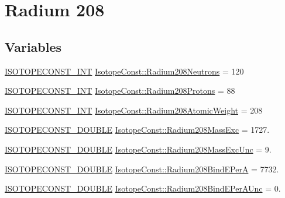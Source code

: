 \hypertarget{group___isotope_const-_radium-_ra208}{}\section{Radium 208}
\label{group___isotope_const-_radium-_ra208}
\subsection*{Variables}
\begin{DoxyCompactItemize}
\item 
\mbox{\hyperlink{group___isotope_const-_macros_ga5f18360b3e99483a35c32d789e62621c}{I\+S\+O\+T\+O\+P\+E\+C\+O\+N\+S\+T\+\_\+\+I\+NT}} \mbox{\hyperlink{group___isotope_const-_radium-_ra208_gad40b4034b993d7e0e483eb5491aa8c6e}{Isotope\+Const\+::\+Radium208\+Neutrons}} = 120
\item 
\mbox{\hyperlink{group___isotope_const-_macros_ga5f18360b3e99483a35c32d789e62621c}{I\+S\+O\+T\+O\+P\+E\+C\+O\+N\+S\+T\+\_\+\+I\+NT}} \mbox{\hyperlink{group___isotope_const-_radium-_ra208_gae6285e48c345de448e9c97e7ee243399}{Isotope\+Const\+::\+Radium208\+Protons}} = 88
\item 
\mbox{\hyperlink{group___isotope_const-_macros_ga5f18360b3e99483a35c32d789e62621c}{I\+S\+O\+T\+O\+P\+E\+C\+O\+N\+S\+T\+\_\+\+I\+NT}} \mbox{\hyperlink{group___isotope_const-_radium-_ra208_ga771687d5f02faf2dff25a9bd93d7d247}{Isotope\+Const\+::\+Radium208\+Atomic\+Weight}} = 208
\item 
\mbox{\hyperlink{group___isotope_const-_macros_ga8f45a7272ce02c0b4c65c44636ed719a}{I\+S\+O\+T\+O\+P\+E\+C\+O\+N\+S\+T\+\_\+\+D\+O\+U\+B\+LE}} \mbox{\hyperlink{group___isotope_const-_radium-_ra208_ga35364331bac6bfdc1ca9c83e753d8ff5}{Isotope\+Const\+::\+Radium208\+Mass\+Exc}} = 1727.
\item 
\mbox{\hyperlink{group___isotope_const-_macros_ga8f45a7272ce02c0b4c65c44636ed719a}{I\+S\+O\+T\+O\+P\+E\+C\+O\+N\+S\+T\+\_\+\+D\+O\+U\+B\+LE}} \mbox{\hyperlink{group___isotope_const-_radium-_ra208_gada413d6ee798f4f7a7432e5880a5d0f5}{Isotope\+Const\+::\+Radium208\+Mass\+Exc\+Unc}} = 9.
\item 
\mbox{\hyperlink{group___isotope_const-_macros_ga8f45a7272ce02c0b4c65c44636ed719a}{I\+S\+O\+T\+O\+P\+E\+C\+O\+N\+S\+T\+\_\+\+D\+O\+U\+B\+LE}} \mbox{\hyperlink{group___isotope_const-_radium-_ra208_ga539d3f1468d7b206d43ebeef1cba0013}{Isotope\+Const\+::\+Radium208\+Bind\+E\+PerA}} = 7732.
\item 
\mbox{\hyperlink{group___isotope_const-_macros_ga8f45a7272ce02c0b4c65c44636ed719a}{I\+S\+O\+T\+O\+P\+E\+C\+O\+N\+S\+T\+\_\+\+D\+O\+U\+B\+LE}} \mbox{\hyperlink{group___isotope_const-_radium-_ra208_gaf2e5aa4a4822fa90410199182107aabf}{Isotope\+Const\+::\+Radium208\+Bind\+E\+Per\+A\+Unc}} = 0.

\end{DoxyCompactItemize}

